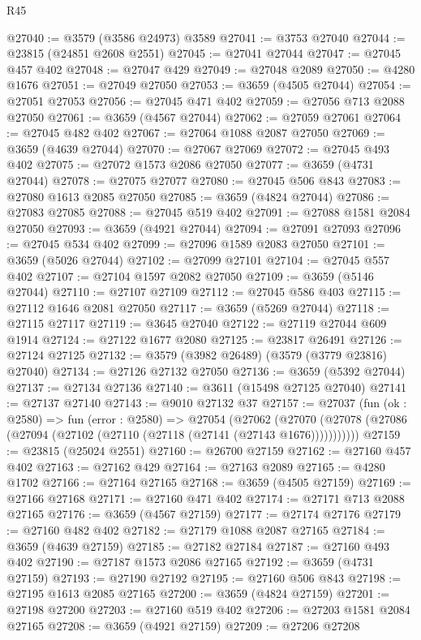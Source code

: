 \begin{lexlean}{R45}
\begin{coremodule}
@27040 := @3579 (@3586 @24973) @3589
@27041 := @3753 @27040
@27044 := @23815 (@24851 @2608 @2551)
@27045 := @27041 @27044
@27047 := @27045 @457 @402
@27048 := @27047 @429
@27049 := @27048 @2089
@27050 := @4280 @1676
@27051 := @27049 @27050
@27053 := @3659 (@4505 @27044)
@27054 := @27051 @27053
@27056 := @27045 @471 @402
@27059 := @27056 @713 @2088 @27050
@27061 := @3659 (@4567 @27044)
@27062 := @27059 @27061
@27064 := @27045 @482 @402
@27067 := @27064 @1088 @2087 @27050
@27069 := @3659 (@4639 @27044)
@27070 := @27067 @27069
@27072 := @27045 @493 @402
@27075 := @27072 @1573 @2086 @27050
@27077 := @3659 (@4731 @27044)
@27078 := @27075 @27077
@27080 := @27045 @506 @843
@27083 := @27080 @1613 @2085 @27050
@27085 := @3659 (@4824 @27044)
@27086 := @27083 @27085
@27088 := @27045 @519 @402
@27091 := @27088 @1581 @2084 @27050
@27093 := @3659 (@4921 @27044)
@27094 := @27091 @27093
@27096 := @27045 @534 @402
@27099 := @27096 @1589 @2083 @27050
@27101 := @3659 (@5026 @27044)
@27102 := @27099 @27101
@27104 := @27045 @557 @402
@27107 := @27104 @1597 @2082 @27050
@27109 := @3659 (@5146 @27044)
@27110 := @27107 @27109
@27112 := @27045 @586 @403
@27115 := @27112 @1646 @2081 @27050
@27117 := @3659 (@5269 @27044)
@27118 := @27115 @27117
@27119 := @3645 @27040
@27122 := @27119 @27044 @609 @1914
@27124 := @27122 @1677 @2080
@27125 := @23817 @26491
@27126 := @27124 @27125
@27132 := @3579 (@3982 @26489) (@3579 (@3779 @23816) @27040)
@27134 := @27126 @27132 @27050
@27136 := @3659 (@5392 @27044)
@27137 := @27134 @27136
@27140 := @3611 (@15498 @27125 @27040)
@27141 := @27137 @27140
@27143 := @9010 @27132 @37
@27157 := @27037
    (fun (ok : @2580) =>
    fun (error : @2580) =>
    @27054
      (@27062
        (@27070 (@27078 (@27086 (@27094 (@27102 (@27110 (@27118 (@27141 (@27143 @1676)))))))))))
@27159 := @23815 (@25024 @2551)
@27160 := @26700 @27159
@27162 := @27160 @457 @402
@27163 := @27162 @429
@27164 := @27163 @2089
@27165 := @4280 @1702
@27166 := @27164 @27165
@27168 := @3659 (@4505 @27159)
@27169 := @27166 @27168
@27171 := @27160 @471 @402
@27174 := @27171 @713 @2088 @27165
@27176 := @3659 (@4567 @27159)
@27177 := @27174 @27176
@27179 := @27160 @482 @402
@27182 := @27179 @1088 @2087 @27165
@27184 := @3659 (@4639 @27159)
@27185 := @27182 @27184
@27187 := @27160 @493 @402
@27190 := @27187 @1573 @2086 @27165
@27192 := @3659 (@4731 @27159)
@27193 := @27190 @27192
@27195 := @27160 @506 @843
@27198 := @27195 @1613 @2085 @27165
@27200 := @3659 (@4824 @27159)
@27201 := @27198 @27200
@27203 := @27160 @519 @402
@27206 := @27203 @1581 @2084 @27165
@27208 := @3659 (@4921 @27159)
@27209 := @27206 @27208

\end{coremodule}
\end{lexlean}
